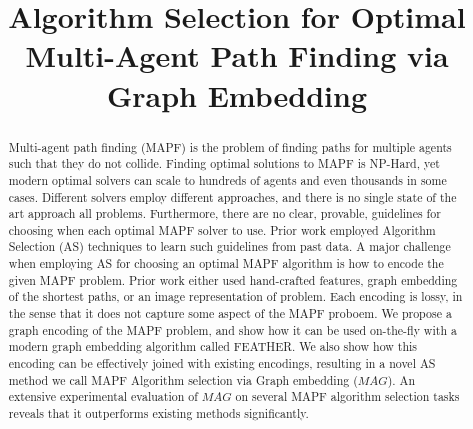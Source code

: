 \documentclass{ecai}
\newcommand{\Carmel}[1]{}
\newcommand{\mapfgas}[1]{\ensuremath{\textit{MAG}}\xspace}
\begin{document}
\begin{frontmatter}

\title{Algorithm Selection for Optimal Multi-Agent Path Finding via Graph Embedding}




\begin{abstract}
Multi-agent path finding (MAPF) is the problem of finding paths for multiple agents such that they do not collide. 
Finding optimal solutions to MAPF is NP-Hard, yet modern optimal solvers can scale to hundreds of agents and even thousands in some cases. 
Different solvers employ different approaches, and there is no single state of the art approach all problems. 
Furthermore, there are no clear, provable, guidelines for choosing when each optimal MAPF solver to use. 
Prior work employed Algorithm Selection (AS) techniques to learn such guidelines from past data. 
A major challenge when employing AS for choosing an optimal MAPF algorithm is how to encode the given MAPF problem. 
Prior work either used hand-crafted features, graph embedding of the shortest paths, or an image representation of problem. Each encoding is lossy, in the sense that it does not capture some aspect of the MAPF proboem. 
We propose a graph encoding of the MAPF problem, and show how it can be used on-the-fly with a modern graph embedding algorithm called FEATHER. 
We also show how this encoding can be effectively joined with existing encodings, resulting in a novel AS method we call MAPF Algorithm selection via Graph embedding (\mapfgas\ ). %
An extensive experimental evaluation of \mapfgas\ on several MAPF algorithm selection tasks reveals that it outperforms existing methods significantly. 
\end{abstract}

\end{frontmatter}
\end{document}
